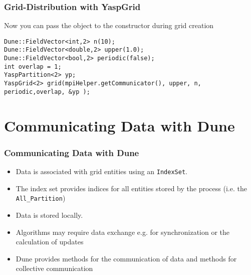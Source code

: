 \begin{frame}[fragile]
  \frametitle<presentation>{Grid-Distribution with YaspGrid}
Now you can pass the object to the constructor during grid creation
\begin{lstlisting}[breaklines=true]
Dune::FieldVector<int,2> n(10);
Dune::FieldVector<double,2> upper(1.0);
Dune::FieldVector<bool,2> periodic(false);
int overlap = 1;
YaspPartition<2> yp;
YaspGrid<2> grid(mpiHelper.getCommunicator(), upper, n, periodic,overlap, &yp );
\end{lstlisting}
\end{frame}

\section{Communicating Data with Dune}
\begin{frame}[fragile]
  \frametitle<presentation>{Communicating Data with Dune}


  \begin{itemize}
  \item Data is associated with grid entities using an \texttt{IndexSet}.
  \item The index set provides indices for all entities stored by the process (i.e. the \texttt{All\_Partition})
  \item Data is stored locally.
  \item Algorithms may require data exchange e.g. for synchronization or the calculation of updates
  \item Dune provides methods for the communication of data and methods for collective communication
  \end{itemize}

\end{frame}


